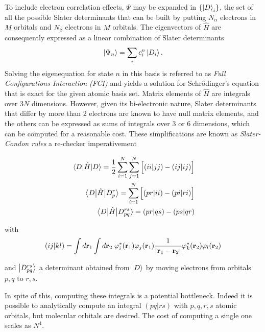 \documentclass[./thesis.tex]{subfiles}
\begin{document}
To include electron correlation effects, $\Psi$ may be expanded in
$\{\ket D_i \}$, the set of all the possible Slater determinants that can be built by putting $N_\alpha$ electrons in $M$ orbitals and $N_\beta$ electrons in $M$ orbitals.
The eigenvectors of $\widehat{H}$ are consequently expressed as a linear combination of Slater determinants 
\begin{equation}
\ket{\Psi_n} = \sum_{i} c_i^n \ket{D_i}.
\end{equation}
Solving the eigenequation for state $n$ in this basis is referred to as \emph{Full Configurations Interaction (FCI)} and yields a solution for Schrödinger's equation that is exact for the given atomic basis set.
Matrix elements of $\widehat H$ are integrals over $3N$ dimensions. However, given its bi-electronic nature, Slater determinants that differ by more than 2 electrons are known to have null matrix elements, and the others can be expressed as sums of integrals over \alert{3 or 6} dimensions, which can be computed for a reasonable cost. These simplifications are known as \emph{Slater-Condon rules} \alert{a re-checker imperativement}

\begin{align}
\mel{D}{\hat{H}}{D} = \frac{1}{2} \sum_{i=1}^N \sum_{j=1}^N \Big [ (ii|jj) - (ij|ij) \Big ]      \\
\mel{D}{\hat{H}}{D_p^r} = \sum_{i=1}^N \Big [ (pr|ii) - (pi|ri) \Big ]      \\
\mel{D}{\hat{H}}{D_{pq}^{rs}} = (pr|qs) - (ps|qr)
\end{align}

with
\begin{equation}
(ij|kl) = \int d{\bf r}_1 \int d{\bf r}_2 \; \varphi^*_i({\bf r}_1)\varphi_j({\bf r}_1) \frac{1}{|{\bf r}_1 - {\bf r}_2|} \varphi^*_k({\bf r}_2)\varphi_l({\bf r}_2)
\end{equation}

and $\ket {D_{pq}^{rs}}$ a determinant obtained from $\ket D$ by moving electrons from \alert{orbitals} $p,q$ to $r,s$.

In spite of this, computing these integrals is a potential bottleneck. Indeed it is possible to analytically compute an integral $(pq|rs)$ with $p,q,r,s$ atomic orbitals, but molecular orbitals are desired. The cost of computing a single one scales as $N^4$.
\end{document}
